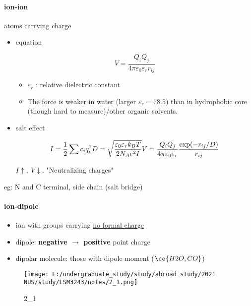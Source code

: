 \documentclass[]{article}
\let\oldparagraph\paragraph
\renewcommand{\paragraph}[1]{\oldparagraph{#1}\mbox{}}
\begin{document}
\hypertarget{ion-ion}{%
\paragraph{ion-ion}\label{ion-ion}}

atoms carrying charge

\begin{itemize}
\item
  equation

  \[V=\dfrac{Q_iQ_j}{4\pi\varepsilon_0\varepsilon_rr_{ij}}\]

  \begin{itemize}
  \item
    \(\varepsilon_r\) : relative dielectric constant
  \item
    The force is weaker in water (larger \(\varepsilon_r=78.5\)) than in
    hydrophobic core (though hard to measure)/other organic solvents.
  \end{itemize}
\item
  salt effect

  \[I=\dfrac{1}{2}\sum c_iq_i^2\\
  D=\sqrt{\dfrac{\varepsilon_0\varepsilon_rk_BT}{2N_Ae^2I}}\\
  V=\dfrac{Q_iQ_j}{4\pi\varepsilon_0\varepsilon_r}\dfrac{\exp(-r_{ij}/D)}{r_{ij}}\]

  \(I \uparrow,\ V\downarrow\). "Neutralizing charges"
\end{itemize}

eg: N and C terminal, side chain (salt bridge)

\hypertarget{ion-dipole}{%
\paragraph{ion-dipole}\label{ion-dipole}}

\begin{itemize}
\item
  ion with groups carrying \underline{no formal charge}
\item
  dipole: \textbf{negative \(\rightarrow\) positive} point charge
\item
  dipolar molecule: those with dipole moment (\(\ce{H2O, CO}\))
\end{itemize}

\begin{figure}
\centering
\texttt{[image: E:/undergraduate\_study/study/abroad study/2021 NUS/study/LSM3243/notes/2\_1.png]}
\caption{2\_1}
\end{figure}
\end{document}
